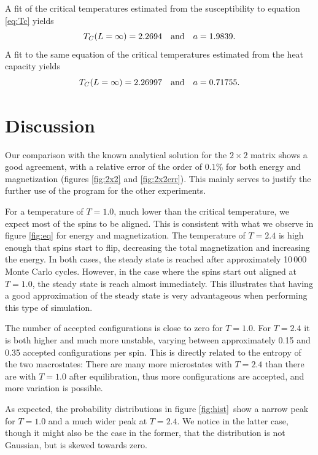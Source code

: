 \documentclass[a4paper,10pt,onecolumn]{article}
\begin{document}
A fit of the critical temperatures estimated from the susceptibility to equation \ref{eq:Tc} yields 
\[T_C(L=\infty) = 2.2694 \qand a = 1.9839.\] 
A fit to the same equation of the critical temperatures estimated from the heat capacity yields 
\[T_C(L=\infty) = 2.26997 \qand a = 0.71755.\] 
 

%
%
%
\section{Discussion}
Our comparison with the known analytical solution for the $2\times2$ matrix shows a good agreement, with a relative error of the order of $0.1\%$ for both energy and magnetization (figures \ref{fig:2x2} and \ref{fig:2x2err}). This mainly serves to justify the further use of the program for the other experiments.

For a temperature of $T=1.0$, much lower than the critical temperature, we expect most of the spins to be aligned. This is consistent with what we observe in figure \ref{fig:eq} for energy and magnetization. 
The temperature of $T=2.4$ is high enough that spins start to flip, decreasing the total magnetization and increasing the energy. 
In both cases, the steady state is reached after approximately 10\,000 Monte Carlo cycles. However, in the case where the spins start out aligned at $T=1.0$, the steady state is reach almost immediately. 
This illustrates that having  a good approximation of the steady state is very advantageous when performing this type of simulation.

The number of accepted configurations is close to zero for $T=1.0$. For $T=2.4$ it is both higher and much more unstable, varying between approximately 0.15 and 0.35 accepted configurations per spin.
This is directly related to the entropy of the two macrostates: There are many more microstates with $T=2.4$ than there are with $T=1.0$ after equilibration, thus more configurations are accepted, and more variation is possible. 

As expected, the probability distributions in figure \ref{fig:hist} show a narrow peak for $T=1.0$ and a much wider peak at $T=2.4$. We notice in the latter case, though it might also be the case in the former, that the distribution is not Gaussian, but is skewed towards zero.
\end{document}

